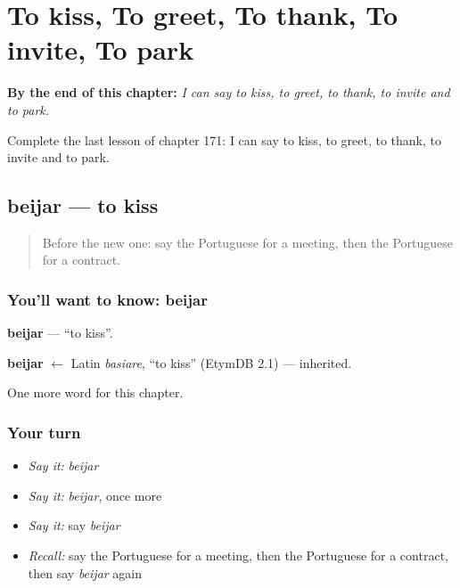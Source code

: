 
\chapter{To kiss, To greet, To thank, To invite, To park}
\label{ch:pt-to-kiss-to-greet-to-thank-to-invite-to-park}

\begin{chapteropening}
\textbf{By the end of this chapter:} \emph{I can say to kiss, to greet, to thank, to invite and to park.}

Complete the last lesson of chapter 171: I can say to kiss, to greet, to thank, to invite and to park.
\end{chapteropening}

\section[beijar]{beijar — to kiss}

\label{lesson:PT-C171-beijar}



\begin{quote}
Before the new one: say the Portuguese for a meeting, then the Portuguese for a contract.
\end{quote}

\subsection*{You'll want to know: beijar}
\textbf{beijar} — \textquotedblleft{}to kiss\textquotedblright{}.

\begin{cousinweb}
\textbf{beijar} $\leftarrow$ Latin \emph{basiare}, \textquotedblleft{}to kiss\textquotedblright{} (EtymDB 2.1) — inherited.
\end{cousinweb}

\begin{grammarlens}[title={What you've built}]
One more word for this chapter.
\end{grammarlens}

\subsection*{Your turn}
\begin{itemize}
\raggedright
  \item \emph{Say it:} \emph{beijar}
  \item \emph{Say it:} \emph{beijar}, once more
  \item \emph{Say it:} say \emph{beijar}
  \item \emph{Recall:} say the Portuguese for a meeting, then the Portuguese for a contract, then say \emph{beijar} again
\end{itemize}

